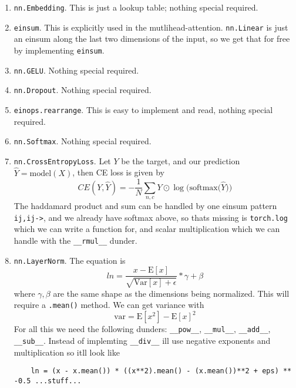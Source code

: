 \documentclass[11pt]{article}
\begin{document}
\begin{enumerate}
  \item \texttt{nn.Embedding}. This is just a lookup table; nothing special required. 
  \item \texttt{einsum}. This is explicitly used in the mutlihead-attention. \texttt{nn.Linear} is just an einsum along the
    last two dimensions of the input, so we get that for free by implementing \texttt{einsum}.
  \item \texttt{nn.GELU}. Nothing special required. 
  \item \texttt{nn.Dropout}. Nothing special required.
  \item \texttt{einops.rearrange}. This is easy to implement and read, nothing special required. 
  \item \texttt{nn.Softmax}. Nothing special required.
  \item \texttt{nn.CrossEntropyLoss}. Let $Y$ be the target, and our prediction 
    $\hat{Y} = \text{model}(X)$, then CE loss is given by
    \begin{equation}
      CE(Y, \hat{Y}) = -\frac{1}{N}\sum_{n, c}Y \odot \log \bigg(\text{softmax} \big(\hat{Y}\big) \bigg) 
    \end{equation}
    The haddamard product and sum can be handled by one einsum pattern \texttt{ij,ij->}, and we already
    have softmax above, so thats missing is \texttt{torch.log} which we can write a function for, 
    and scalar multiplication which we can handle with the \texttt{\_\_rmul\_\_} dunder.  
  \item \texttt{nn.LayerNorm}. The equation is
    \begin{equation}
      ln = \frac{x - \text{E}[x]}{\sqrt{\text{Var}[x] + \epsilon}} * \gamma + \beta
    \end{equation}
    where $\gamma, \beta$ are the same shape as the dimensions being normalized. This will require a \texttt{.mean()} 
    method. We can get variance with
    \begin{equation}
      \text{var} = \text{E}[x^2] - \text{E}[x]^2
    \end{equation}
    For all this we need the following dunders: \texttt{\_\_pow\_\_}, \texttt{\_\_mul\_\_}, \texttt{\_\_add\_\_}, \texttt{\_\_sub\_\_}. 
    Instead of implemting \texttt{\_\_div\_\_} ill use negative exponents and multiplication so itll look like 
    \begin{verbatim}
    ln = (x - x.mean()) * ((x**2).mean() - (x.mean())**2 + eps) ** -0.5 ...stuff...
    \end{verbatim}
\end{enumerate}
\end{document}
